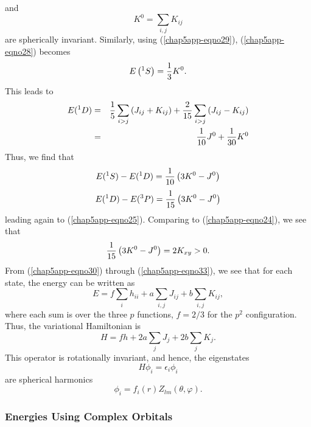 and
\begin{equation}
K^0 = \sum_{i,j} K_{ij}
\label{chap5app-eqno31b}
\end{equation}
are spherically invariant.  Similarly, using (\ref{chap5app-eqno29}),
(\ref{chap5app-eqno28}) becomes 
\begin{equation}
E \left( {^1S} \right) = {1 \over 3} K^0 .
\label{chap5app-eqno32}
\end{equation}
This leads to
\begin{eqnarray}
E ( {^1D} ) &=& {1 \over 5} \sum_{i>j} \left( J_{ij} + K_{ij}\right) 
    + {2 \over 15} \sum_{i>j} \left( J_{ij} - K_{ij}\right) \cr
 &=& {1 \over 10} J^0 + {1 \over 30} K^0
\label{chap5app-eqno33}
\end{eqnarray}
Thus, we find that
\begin{equation}
E ( {^1S} ) - E ( {^1D} ) = {1 \over 10} \left( 3K^0 - J^0 \right)
\end{equation}
\begin{equation}
E ( {^1D} ) - E ( {^3P} ) = {1 \over 15} \left( 3 K^0 - J^0 \right)
\end{equation}
leading again to (\ref{chap5app-eqno25}).  Comparing to
(\ref{chap5app-eqno24}), we see that
\begin{equation}
{1 \over 15} \left( 3K^0 - J^0 \right) = 2 K_{xy} > 0 .
\end{equation}
From (\ref{chap5app-eqno30}) through (\ref{chap5app-eqno33}), we see
that for each state, the energy can be written as
\begin{equation}
E = f \sum_{i} h_{ii} + a \sum_{i,j} J_{ij} + b \sum_{i,j} K_{ij} ,
\end{equation}
where each sum is over the three $p$ functions, $f = 2/3$ for the 
$p^2$ configuration.  Thus, the variational Hamiltonian is
\begin{equation}
H = fh  + 2 a \sum_{j} J_j + 2 b \sum_{j} K_j .
\end{equation}
This operator is rotationally invariant, and hence, the eigenstates
\begin{equation}
H \phi_i = \epsilon_i \phi_i
\end{equation}
are spherical harmonics
\begin{equation}
\phi_i = f_i ( r ) Z_{lm} ( \theta , \varphi ) .
\end{equation}

\subsubsection{Energies Using Complex Orbitals}

